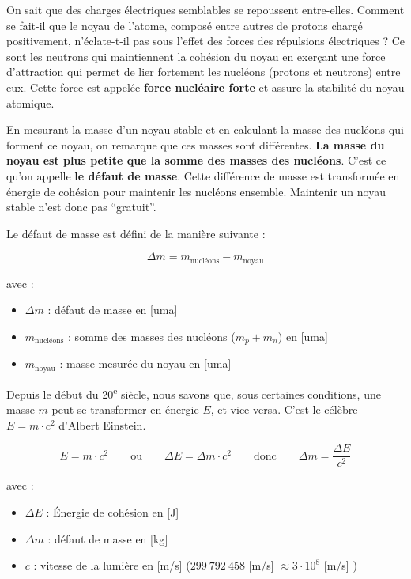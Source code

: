 \documentclass[
  11pt,
  a4paper,
  openany]{book}
\providecommand{\tightlist}{%
  \setlength{\itemsep}{0pt}\setlength{\parskip}{0pt}}
\begin{document}
On sait que des charges électriques semblables se repoussent entre-elles. Comment se fait-il que le noyau de l'atome, composé entre autres de protons chargé positivement, n'éclate-t-il pas sous l'effet des forces des répulsions électriques ? Ce sont les neutrons qui maintiennent la cohésion du noyau en exerçant une force d'attraction qui permet de lier fortement les nucléons (protons et neutrons) entre eux. Cette force est appelée \textbf{force nucléaire forte} et assure la stabilité du noyau atomique.

En mesurant la masse d'un noyau stable et en calculant la masse des nucléons qui forment ce noyau, on remarque que ces masses sont différentes. \textbf{La masse du noyau est plus petite que la somme des masses des nucléons}. C'est ce qu'on appelle \textbf{le défaut de masse}. Cette différence de masse est transformée en énergie de cohésion pour maintenir les nucléons ensemble. Maintenir un noyau stable n'est donc pas ``gratuit''.

Le défaut de masse est défini de la manière suivante :

\[
\Delta m = m_{\text{nucléons}} - m_{\text{noyau}}
\]

avec :

\begin{itemize}
\tightlist
\item
  \(\Delta m\) : défaut de masse en {[}uma{]}\\
\item
  \(m_{\text{nucléons}}\) : somme des masses des nucléons (\(m_p + m_n\)) en {[}uma{]}\\
\item
  \(m_{\text{noyau}}\) : masse mesurée du noyau en {[}uma{]}
\end{itemize}

\clearpage

Depuis le début du 20\textsuperscript{e} siècle, nous savons que, sous certaines conditions, une masse \(m\) peut se transformer en énergie \(E\), et vice versa. C'est le célèbre \(E = m \cdot c^2\) d'Albert Einstein.

\[
E = m \cdot c^2 \qquad \text{ou} \qquad \Delta E = \Delta m \cdot c^2 \qquad \text{donc} \qquad \Delta m = \frac{\Delta E}{c^2}
\]

avec :

\begin{itemize}
\tightlist
\item
  \(\Delta E\) : Énergie de cohésion en {[}J{]}\\
\item
  \(\Delta m\) : défaut de masse en {[}kg{]}\\
\item
  \(c\) : vitesse de la lumière en {[}m/s{]} (\(299\ 792\ 458\) {[}m/s{]} \(\approx 3 \cdot 10^8\) {[}m/s{]} )
\end{itemize}
\end{document}
